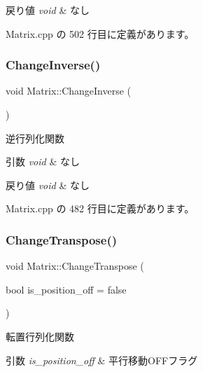 \begin{DoxyRetVals}{戻り値}
{\em void} & なし \\
\hline
\end{DoxyRetVals}


 Matrix.\+cpp の 502 行目に定義があります。

\mbox{\label{class_matrix_a9b351172385ed7b14f21840ed654490e}} 
\subsubsection{\texorpdfstring{Change\+Inverse()}{ChangeInverse()}}
{\footnotesize\ttfamily void Matrix\+::\+Change\+Inverse (\begin{DoxyParamCaption}{ }\end{DoxyParamCaption})}



逆行列化関数 


\begin{DoxyParams}{引数}
{\em void} & なし \\
\hline
\end{DoxyParams}

\begin{DoxyRetVals}{戻り値}
{\em void} & なし \\
\hline
\end{DoxyRetVals}


 Matrix.\+cpp の 482 行目に定義があります。

\mbox{\label{class_matrix_aed98c9d04ddadd3697c382dcddf3a4f0}} 
\subsubsection{\texorpdfstring{Change\+Transpose()}{ChangeTranspose()}}
{\footnotesize\ttfamily void Matrix\+::\+Change\+Transpose (\begin{DoxyParamCaption}\item[{bool}]{is\+\_\+position\+\_\+off = {\ttfamily false} }\end{DoxyParamCaption})}



転置行列化関数 


\begin{DoxyParams}{引数}
{\em is\+\_\+position\+\_\+off} & 平行移動\+O\+F\+Fフラグ \\
\hline
\end{DoxyParams}

